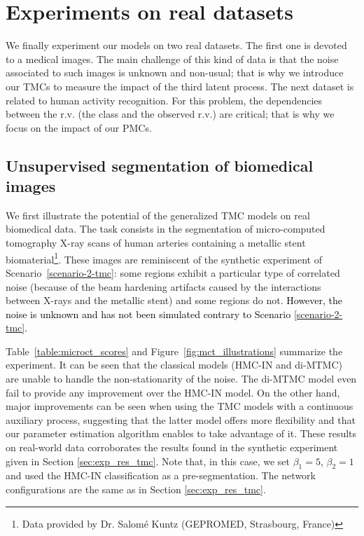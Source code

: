 \section{Experiments on real datasets}
\label{sec:realworld}
We finally experiment our models on two 
real datasets. The first one is devoted to 
a medical images. The main challenge 
of this kind of data is that the noise associated to such images is unknown and non-usual; 
that is why we introduce our TMCs to measure the impact of the third latent process.
The next dataset is related to human activity recognition. 
For this problem, the dependencies between the r.v. (the class and the observed r.v.) 
are critical; that is why we focus on the impact of our PMCs.


\subsection{Unsupervised segmentation of biomedical images}
\label{sec:realworld_mct}
We first illustrate the potential of the generalized TMC models on real biomedical data.
The task consists in the segmentation of micro-computed tomography X-ray scans
of human arteries containing a metallic stent biomaterial\footnote{Data provided by Dr. Salomé Kuntz (GEPROMED, Strasbourg, France)}. 
These images are reminiscent of the synthetic experiment of 
Scenario~\eqref{scenario-2-tmc}: some regions exhibit a particular type of correlated noise (because of
 the beam hardening artifacts caused by the interactions
between X-rays and the metallic stent) and some regions do not. \textcolor{black}{However, the noise is unknown and has not been simulated contrary to Scenario \eqref{scenario-2-tmc}.}

Table~\ref{table:microct_scores} and Figure~\ref{fig:mct_illustrations} summarize the experiment. It can be seen that the classical models (HMC-IN and di-MTMC) are unable to handle the non-stationarity of the noise. The di-MTMC model even fail to provide any improvement over the HMC-IN model. On the other hand, major improvements can be seen when using the TMC models with a continuous auxiliary process, suggesting that the latter model offers more flexibility and that our parameter estimation algorithm enables to take advantage of it. These results on real-world data corroborates the results found in the synthetic experiment given in Section \ref{sec:exp_res_tmc}. Note that, in this case, we set $\beta_1=5$, $\beta_2=1$ and used the HMC-IN classification as a pre-segmentation. The network configurations are the same as in Section \ref{sec:exp_res_tmc}.


